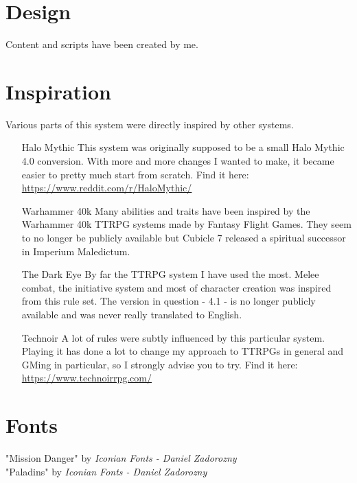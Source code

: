 \section*{Design}
Content and scripts have been created by me.

\section*{Inspiration}
Various parts of this system were directly inspired by other systems.
\begin{enumerate}
	\item[Halo Mythic] This system was originally supposed to be a small Halo Mythic 4.0 conversion. With more and more changes I wanted to make, it became easier to pretty much start from scratch. Find it here:\\ \url{https://www.reddit.com/r/HaloMythic/}
	\item[Warhammer 40k] Many abilities and traits have been inspired by the Warhammer 40k TTRPG systems made by Fantasy Flight Games. They seem to no longer be publicly available but Cubicle 7 released a spiritual successor in Imperium Maledictum.
	\item[The Dark Eye] By far the TTRPG system I have used the most. Melee combat, the initiative system and most of character creation was inspired from this rule set. The version in question - 4.1 - is no longer publicly available and was never really translated to English.
	\item[Technoir] A lot of rules were subtly influenced by this particular system. Playing it has done a lot to change my approach to TTRPGs in general and GMing in particular, so I strongly advise you to try. Find it here:\\ \url{https://www.technoirrpg.com/}
\end{enumerate}

\section*{Fonts}
"Mission Danger" by \textit{Iconian Fonts - Daniel Zadorozny}\\
"Paladins" by \textit{Iconian Fonts - Daniel Zadorozny}

